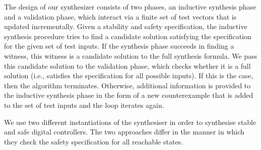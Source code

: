 \documentclass[10pt,conference]{IEEEtran}
\begin{document}


The design of our synthesizer consists of two phases, an inductive
synthesis phase and a validation phase, which interact via a finite
set of test vectors that is updated incrementally.  Given a stability
and safety specification, the inductive synthesis procedure tries to
find a candidate solution satisfying the specification for the given set of test inputs.
%
If the synthesis phase succeeds in finding a witness, this witness is
a candidate solution to the full synthesis formula.  We pass this
candidate solution to the validation phase, which checks whether it is
a full solution (i.e., satisfies the specification for all possible
inputs).  If this is the case, then the algorithm terminates.
Otherwise, additional information is provided to the inductive
synthesis phase in the form of a new counterexample that is added to
the set of test inputs and the loop iterates again.

We use two different instantiations of the synthesiser
in order to synthesise stable and safe digital
controllers. The two approaches differ in
the manner in which they check the safety specification
for all reachable states.
\end{document}
